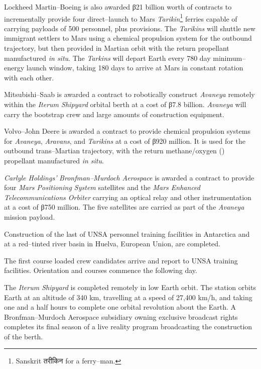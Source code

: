 Lockheed Martin--Boeing is also awarded β21 billion worth of contracts to incrementally provide four direct--launch to Mars {\it Tarikin}\footnote{Sanskrit तरीकिन for a ferry--man.} ferries capable of carrying payloads of 500 personnel, plus provisions. The {\it Tarikins} will shuttle new immigrant settlers to Mars using a chemical  propulsion system for the outbound trajectory, but then provided in Martian orbit with the return  propellant manufactured {\it in situ}. The {\it Tarkins} will depart Earth every 780 day minimum--energy launch window, taking 180 days to arrive at Mars in constant rotation with each other.

Mitsubishi--Saab is awarded a contract to robotically construct {\it Avaneya} remotely within the {\it Iterum Shipyard} orbital berth at a cost of β7.8 billion. {\it Avaneya} will carry the bootstrap crew and large amounts of construction equipment.

Volvo--John Deere is awarded a contract to provide chemical propulsion systems for {\it Avaneya}, {\it Aravans}, and {\it Tarikins} at a cost of β920 million. It is used for the outbound trans--Martian trajectory, with the return methane/oxygen () propellant manufactured {\it in situ}.

{\it Carlyle Holdings'} {\it Bronfman--Murdoch Aerospace} is awarded a contract to provide four {\it Mars Positioning System} satellites and the {\it Mars Enhanced Telecommunications Orbiter} carrying an optical relay and other instrumentation at a cost of β750 million. The five satellites are carried as part of the {\it Avaneya} mission payload.
\StopTimelineDate

Construction of the last of UNSA personnel training facilities in Antarctica and at a red--tinted river basin in Huelva, European Union, are completed.
\StopTimelineDate

The first course loaded crew candidates arrive and report to UNSA training facilities. Orientation and courses commence the following day.
\StopTimelineDate

The {\it Iterum Shipyard} is completed remotely in low Earth orbit. The station orbits Earth at an altitude of 340 km, travelling at a speed of 27,400 km/h, and taking one and a half hours to complete one orbital revolution about the Earth. A Bronfman--Murdoch Aerospace subsidiary owning exclusive broadcast rights completes its final season of a live reality program broadcasting the construction of the berth.
\StopTimelineDate


